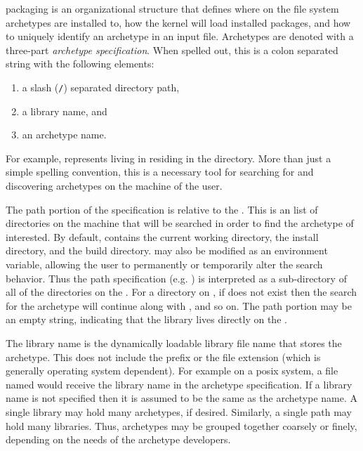 \cyclus packaging is an organizational structure that defines where on the file system 
archetypes are installed to, how the \cyclus kernel will load installed
packages, and how to uniquely identify an archetype in an input file.  Archetypes 
are denoted with a three-part \emph{archetype specification}. When spelled out, this
is a colon separated string with the following elements:
\begin{enumerate}
    \item a slash (\texttt{/}) separated directory path,
    \item a library name, and
    \item an archetype name.
\end{enumerate}
For example,  represents  living
in  residing in the  directory. More than just 
a simple spelling convention, this is a necessary
tool for searching for and discovering archetypes on the machine of the user.

The path portion of the specification is relative to the . This is 
an list of directories on the machine that will be searched in order to find the 
archetype of interested. By default,  contains the current working 
directory, the \cyclus install directory, and the \cyclus build directory. 
 may also be modified as an environment variable, allowing the user
to permanently or temporarily alter the \cyclus search behavior.  Thus the path 
specification (e.g. ) is interpreted as a sub-directory of all of 
the directories on the . For a directory  on 
, if   does not exist then the search for 
the archetype will continue along with , and so on. The path portion 
may be an empty string, indicating that the library lives directly on the 
.

The library name is the dynamically loadable library file name that stores the 
archetype. This does not include the  prefix or the file extension 
(which is generally operating system dependent).  For example on a posix system,
a file named  would receive the library name 
in the archetype specification. 
If a library name is not specified then it is assumed to be the same as the 
archetype name.
A single library may hold many archetypes, if desired.
Similarly, a single path may hold many libraries. Thus, archetypes may be grouped
together coarsely or finely, depending on the needs of the archetype developers.

